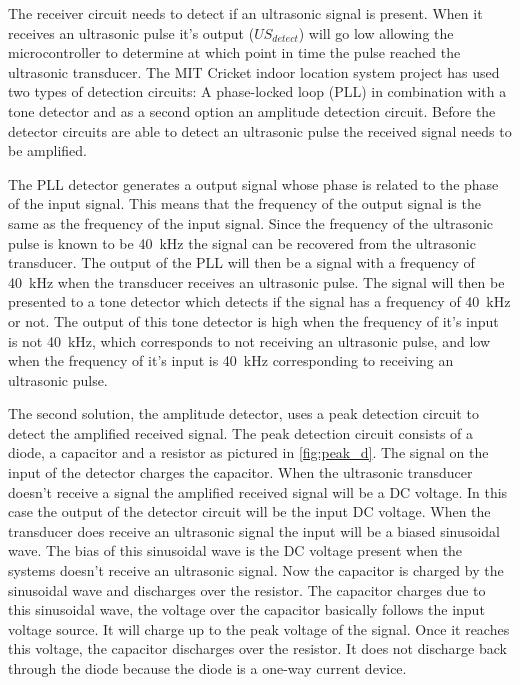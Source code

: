 The receiver circuit needs to detect if an ultrasonic signal is present.
When it receives an ultrasonic pulse it's output ($US_{detect}$) will go low allowing the microcontroller to determine at which point in time the pulse reached the ultrasonic transducer.
The MIT Cricket indoor location system \cite{Balakrishnan2003, Priyantha2000} project has used two types of detection circuits: A phase-locked loop (PLL) in combination with a tone detector and as a second option an amplitude detection circuit.
Before the detector circuits are able to detect an ultrasonic pulse the received signal needs to be amplified.

The PLL detector generates a output signal whose phase is related to the phase of the input signal.
This means that the frequency of the output signal is the same as the frequency of the input signal.
Since the frequency of the ultrasonic pulse is known to be \SI{40}{\kilo\hertz}
the signal can be recovered from the ultrasonic transducer.
The output of the PLL will then be a signal with a frequency of \SI{40}{\kilo\hertz} when the transducer receives an ultrasonic pulse.
The signal will then be presented to a tone detector which detects if the signal has a frequency of \SI{40}{\kilo\hertz} or not.
The output of this tone detector is high when the frequency of it's input is not \SI{40}{\kilo\hertz}, which corresponds to not receiving an ultrasonic pulse, and low when the frequency of it's input is \SI{40}{\kilo\hertz} corresponding to receiving an ultrasonic pulse.

The second solution, the amplitude detector, uses a peak detection circuit to detect the amplified received signal.
The peak detection circuit consists of a diode, a capacitor and a resistor as pictured in \ref{fig:peak_d}.
The signal on the input of the detector charges the capacitor.
When the ultrasonic transducer doesn't receive a signal the amplified received signal will be a DC voltage.
In this case the output of the detector circuit will be the input DC voltage.
When the transducer does receive an ultrasonic signal the input will be a biased sinusoidal wave.
The bias of this sinusoidal wave is the DC voltage present when the systems doesn't receive an ultrasonic signal.
Now the capacitor is charged by the sinusoidal wave and discharges over the resistor.
The capacitor charges due to this sinusoidal wave, the voltage over the capacitor basically follows the input voltage source.
It will charge up to the peak voltage of the signal. Once it reaches this voltage, the capacitor discharges over the resistor.
It does not discharge back through the diode because the diode is a one-way current device.


